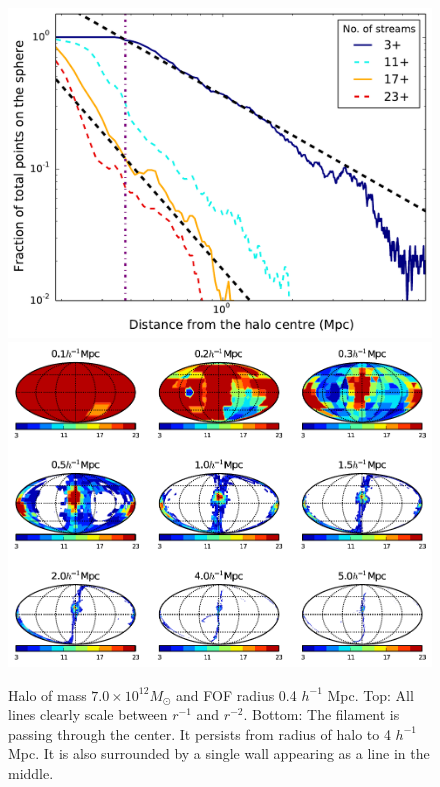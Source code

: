 \begin{figure}
\begin{minipage}[t]{.99\linewidth}
  \centering\includegraphics[width=10.cm]{Chapter3/Source_v2/fig9a}
\includegraphics[width=10.cm]{Chapter3/Source_v2/fig9b} 
\end{minipage}\hfill
\caption{Halo of mass $7.0 \times 10^{12} M_{\odot} $  and  FOF radius 0.4 $h^{-1}$ Mpc. Top: All lines clearly scale between $r^{-1}$ and $r^{-2}$. Bottom: The filament is passing through the center. It persists from radius of halo to 4 $h^{-1}$ Mpc. It is also surrounded by a single wall appearing as a line in the middle.}
\label{fig:706}
\end{figure}



